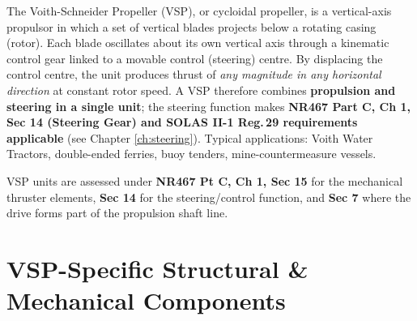 \documentclass[11pt,a4paper]{report}
\begin{document}
The Voith-Schneider Propeller (VSP), or cycloidal propeller, is a vertical-axis
propulsor in which a set of vertical blades projects below a rotating casing
(rotor). Each blade oscillates about its own vertical axis through a kinematic
control gear linked to a movable control (steering) centre. By displacing the
control centre, the unit produces thrust of \emph{any magnitude in any
horizontal direction} at constant rotor speed. A VSP therefore combines
\textbf{propulsion and steering in a single unit}; the steering function makes
\textbf{NR467 Part C, Ch 1, Sec 14 (Steering Gear) and SOLAS II-1 Reg.\,29
requirements applicable} (see Chapter \ref{ch:steering}). Typical applications:
Voith Water Tractors, double-ended ferries, buoy tenders, mine-countermeasure
vessels.

VSP units are assessed under \textbf{NR467 Pt C, Ch 1, Sec 15} for the
mechanical thruster elements, \textbf{Sec 14} for the steering/control function,
and \textbf{Sec 7} where the drive forms part of the propulsion shaft line.

\section{VSP-Specific Structural \& Mechanical Components}
\end{document}
